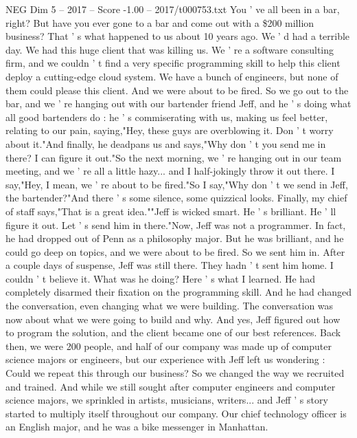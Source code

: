 \begin{textsample}{NEG Dim 5 – 2017 – Score -1.00 – 2017/t000753.txt}  \label{ex:f5_neg_022}
You ' ve all been in a bar, right?
But have you ever gone to a bar and come out with a \$200 million business?
That ' s what happened to us about 10 years ago.
We ' d had a terrible day.
We had this huge client that was killing us.
We ' re a software consulting firm, and we couldn ' t find a very specific programming skill to help this client deploy a cutting-edge cloud system.
We have a bunch of engineers, but none of them could please this client.
And we were about to be fired.
So we go out to the bar, and we ' re hanging out with our bartender friend Jeff, and he ' s doing what all good bartenders do : he ' s commiserating with us, making us feel better, relating to our pain, saying,"Hey, these guys are overblowing it.
Don ' t worry about it."And finally, he deadpans us and says,"Why don ' t you send me in there?
I can figure it out."So the next morning, we ' re hanging out in our team meeting, and we ' re all a little hazy... and I half-jokingly throw it out there.
I say,"Hey, I mean, we ' re about to be fired."So I say,"Why don ' t we send in Jeff, the bartender?"And there ' s some silence, some quizzical looks.
Finally, my chief of staff says,"That is a great idea.""Jeff is wicked smart.
He ' s brilliant.
He ' ll figure it out.
Let ' s send him in there."Now, Jeff was not a programmer.
In fact, he had dropped out of Penn as a philosophy major.
But he was brilliant, and he could go deep on topics, and we were about to be fired.
So we sent him in.
After a couple days of suspense, Jeff was still there.
They hadn ' t sent him home.
I couldn ' t believe it.
What was he doing?
Here ' s what I learned.
He had completely disarmed their fixation on the programming skill.
And he had changed the conversation, even changing what we were building.
The conversation was now about what we were going to build and why.
And yes, Jeff figured out how to program the solution, and the client became one of our best references.
Back then, we were 200 people, and half of our company was made up of computer science majors or engineers, but our experience with Jeff left us wondering : Could we repeat this through our business?
So we changed the way we recruited and trained.
And while we still sought after computer engineers and computer science majors, we sprinkled in artists, musicians, writers... and Jeff ' s story started to multiply itself throughout our company.
Our chief technology officer is an English major, and he was a bike messenger in Manhattan.

\end{textsample}

